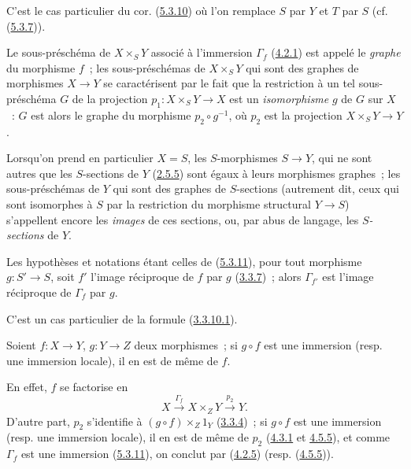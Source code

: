C'est le cas particulier du cor. (\hyperref[I.5.3.10-fr]{5.3.10}) où l'on
remplace $S$ par $Y$ et $T$ par $S$
(cf. (\hyperref[I.5.3.7-fr]{5.3.7})).

Le sous-préschéma de $X\times_S Y$ associé à l'immersion $\Gamma_f$
(\hyperref[I.4.2.1-fr]{4.2.1}) est appelé le \emph{graphe} du morphisme $f$~;
les sous-préschémas de $X\times_S Y$ qui sont des graphes de morphismes
$X\to Y$ se caractérisent par le fait que la restriction à un tel
sous-préschéma $G$ de la projection $p_1:X\times_S Y\to X$ est un
\emph{isomorphisme} $g$ de $G$ sur $X$~: $G$ est alors le graphe du morphisme
$p_2\circ g^{-1}$, où $p_2$ est la projection $X\times_S Y\to Y$.

Lorsqu'on prend en particulier $X=S$, les $S$-morphismes $S\to Y$, qui ne
sont autres que les $S$-sections de $Y$ (\hyperref[I.2.5.5-fr]{2.5.5}) sont
égaux à leurs morphismes graphes~; les sous-préschémas de $Y$ qui sont des
graphes de $S$-sections (autrement dit, ceux qui sont isomorphes à $S$ par la
restriction du morphisme structural $Y\to S$) s'appellent encore les
\emph{images} de ces sections, ou, par abus de langage, les
\emph{$S$-sections} de $Y$.

\begin{corollary}[5.3.12]
\label{I.5.3.12-fr}
Les hypothèses et notations étant celles de
(\hyperref[I.5.3.11-fr]{5.3.11}), pour tout morphisme $g:S'\to S$, soit $f'$
l'image réciproque de $f$ par $g$ (\hyperref[I.3.3.7-fr]{3.3.7})~; alors
$\Gamma_{f'}$ est l'image réciproque de $\Gamma_f$ par $g$.
\end{corollary}

C'est un cas particulier de la formule
(\hyperref[I.3.3.10.1-fr]{3.3.10.1}).

\begin{corollary}[5.3.13]
\label{I.5.3.13-fr}
Soient $f:X\to Y$, $g:Y\to Z$ deux morphismes~; si $g\circ f$ est une
immersion (resp. une immersion locale), il en est de même de $f$.
\end{corollary}

En effet, $f$ se factorise en
\[
  X\xrightarrow{\Gamma_f}X\times_Z Y\xrightarrow{p_2}Y.
\]
D'autre part, $p_2$ s'identifie à $(g\circ f)\times_Z 1_Y$
(\hyperref[I.3.3.4-fr]{3.3.4})~; si $g\circ f$ est une immersion (resp. une
immersion locale), il en est de même de $p_2$
(\hyperref[I.4.3.1-fr]{4.3.1} et \hyperref[I.4.5.5-fr]{4.5.5}), et comme
$\Gamma_f$ est une immersion (\hyperref[I.5.3.11-fr]{5.3.11}), on conclut
par (\hyperref[I.4.2.5-fr]{4.2.5}) (resp.
(\hyperref[I.4.5.5-fr]{4.5.5})).

